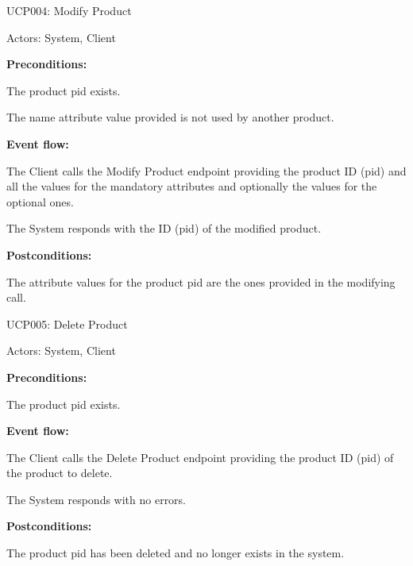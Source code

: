 \begin{ucbox}{UCP004: Modify Product}
\label{UCP004}

Actors: System, Client

\textbf{Preconditions:}

\ucitem The product pid exists.

\ucitem The name attribute value provided is not used by another product.

\textbf{Event flow:}

\ucitem The Client calls the Modify Product endpoint providing the product ID (pid) and all the values for the mandatory attributes and optionally the values for the optional ones.

\ucitem The System responds with the ID (pid) of the modified product.

\textbf{Postconditions:}

\ucitem The attribute values for the product pid are the ones provided in the modifying call.

\end{ucbox}

\begin{ucbox}{UCP005: Delete Product}
\label{UCP005}

Actors: System, Client

\textbf{Preconditions:}

\ucitem The product pid exists.

\textbf{Event flow:}

\ucitem The Client calls the Delete Product endpoint providing the product ID (pid) of the product to delete.

\ucitem The System responds with no errors.

\textbf{Postconditions:}

\ucitem The product pid has been deleted and no longer exists in the system.

\end{ucbox}
\newpage
